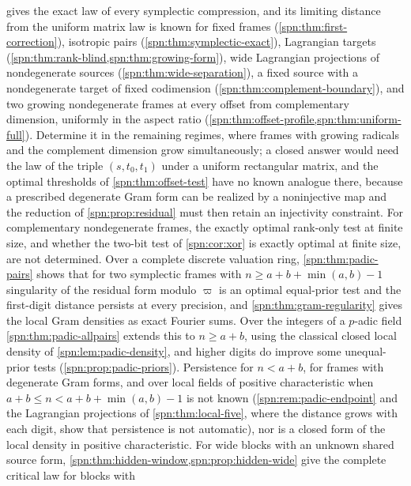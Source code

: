 \begin{question}\label{spn:q:symplectic}
 gives the exact law of every symplectic compression, and its
limiting distance from the uniform matrix law is known for fixed frames
(\cref{spn:thm:first-correction}), isotropic pairs (\cref{spn:thm:symplectic-exact}),
Lagrangian targets (\cref{spn:thm:rank-blind,spn:thm:growing-form}), wide Lagrangian projections of
nondegenerate sources (\cref{spn:thm:wide-separation}), a fixed source with a
nondegenerate target of fixed codimension (\cref{spn:thm:complement-boundary}), and two
growing nondegenerate frames at every offset from complementary dimension, uniformly in the
aspect ratio (\cref{spn:thm:offset-profile,spn:thm:uniform-full}). Determine it in the remaining
regimes, where frames with growing radicals and the complement dimension grow simultaneously; a
closed answer would need the law of the triple $(s,t_0,t_1)$ under a uniform rectangular matrix,
and the optimal thresholds of \cref{spn:thm:offset-test} have no known analogue there, because a
prescribed degenerate Gram form can be realized by a noninjective map and the reduction of
\cref{spn:prop:residual} must then retain an injectivity constraint. For complementary
nondegenerate frames, the exactly optimal rank-only test at finite size, and whether the two-bit
test of \cref{spn:cor:xor} is exactly optimal at finite size, are not determined. Over a complete
discrete valuation ring, \cref{spn:thm:padic-pairs} shows that for two symplectic frames with
$n\ge a+b+\min(a,b)-1$ singularity of the residual form modulo $\varpi$ is an optimal equal-prior
test and the first-digit distance persists at every precision, and \cref{spn:thm:gram-regularity}
gives the local Gram densities as exact Fourier sums. Over the integers of a $p$-adic field
\cref{spn:thm:padic-allpairs} extends this to $n\ge a+b$, using the classical closed local density of
\cref{spn:lem:padic-density}, and higher digits do improve some unequal-prior tests
(\cref{spn:prop:padic-priors}). Persistence for $n<a+b$, for frames with degenerate Gram forms, and over
local fields of positive characteristic when $a+b\le n<a+b+\min(a,b)-1$ is not known
(\cref{spn:rem:padic-endpoint} and the Lagrangian projections of \cref{spn:thm:local-five}, where the
distance grows with each digit, show that persistence is not automatic), nor is a closed form of the local
density in positive characteristic. For wide blocks with an unknown shared source form,
\cref{spn:thm:hidden-window,spn:prop:hidden-wide} give the complete critical law for blocks with

\end{question}
